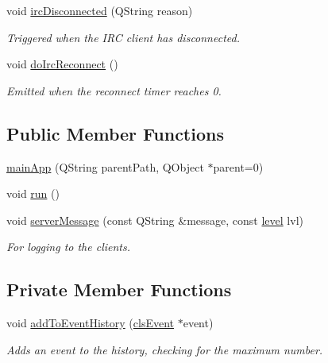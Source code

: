 \begin{DoxyCompactItemize}
void \hyperlink{classserver_1_1main_app_af6e8c9d1f06514b33e5f88f9e66884be}{irc\-Disconnected} (Q\-String reason)
\begin{DoxyCompactList}\small\item\em Triggered when the I\-R\-C client has disconnected. \end{DoxyCompactList}\item 
void \hyperlink{classserver_1_1main_app_aa9d4c2e1dc5216901c4f8743838d4561}{do\-Irc\-Reconnect} ()
\begin{DoxyCompactList}\small\item\em Emitted when the reconnect timer reaches 0. \end{DoxyCompactList}\end{DoxyCompactItemize}
\subsection*{Public Member Functions}
\begin{DoxyCompactItemize}
\item 
\hyperlink{classserver_1_1main_app_a3e07813343ad98135e619cec6b0cbfdc}{main\-App} (Q\-String parent\-Path, Q\-Object $\ast$parent=0)
\item 
void \hyperlink{classserver_1_1main_app_af331bc3bf60e745f3ddc95ab3abe5188}{run} ()
\item 
void \hyperlink{classserver_1_1main_app_a7263ca5b3630b0a2774f556b96c333c8}{server\-Message} (const Q\-String \&message, const \hyperlink{namespaceshared_ac45ebac56812e48d57e16c9cf057a1db}{level} lvl)
\begin{DoxyCompactList}\small\item\em For logging to the clients. \end{DoxyCompactList}\end{DoxyCompactItemize}
\subsection*{Private Member Functions}
\begin{DoxyCompactItemize}
\item 
void \hyperlink{classserver_1_1main_app_a3f2522c9bfcd7593aad9c906d24b6016}{add\-To\-Event\-History} (\hyperlink{classshared_1_1events_1_1cls_event}{cls\-Event} $\ast$event)
\begin{DoxyCompactList}\small\item\em Adds an event to the history, checking for the maximum number. \end{DoxyCompactList}\end{DoxyCompactItemize}
